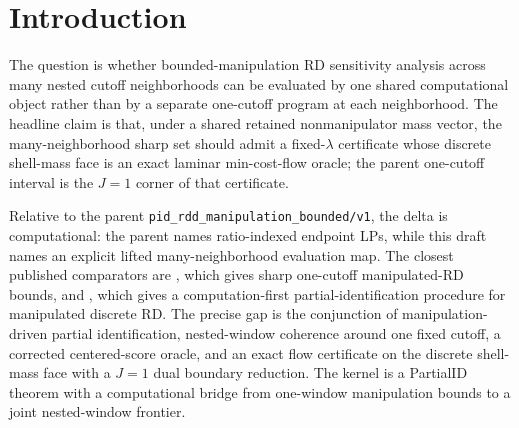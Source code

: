 \documentclass[11pt]{article}
\theoremstyle{definition}
\theoremstyle{plain}
\theoremstyle{remark}
\begin{document}
\begin{abstract}
The banked parent proposal \texttt{pid\_rdd\_manipulation\_bounded/v1} gives a sharp
one-cutoff manipulation envelope for a local RD Wald effect. This draft asks for the
computational upgrade needed when the analyst reports sharp bounds jointly across many
nested cutoff neighborhoods instead of one window at a time. The kernel claim is that the
shared nonmanipulator mass vector across nested windows creates a laminar feasibility system,
and that on an explicit discrete shell-mass face the fixed-\(\lambda\) upper-orthant problem
admits an exact incidence-based min-cost-flow representation with a dual certificate that
specializes to the parent \(J=1\) interval. The open part is the passage from that exact
network oracle to the unrestricted finite-support many-window problem. If correct, the result
turns a qualitative many-window sensitivity idea into a computable evaluation map and makes
intersection-bound inference operational for manipulation-robust RD frontiers.
\end{abstract}

\section{Introduction}
The question is whether bounded-manipulation RD sensitivity analysis across many nested
cutoff neighborhoods can be evaluated by one shared computational object rather than by a
separate one-cutoff program at each neighborhood. The headline claim is that, under a shared
retained nonmanipulator mass vector, the many-neighborhood sharp set should admit a
fixed-\(\lambda\) certificate whose discrete shell-mass face is an exact laminar min-cost-flow
oracle; the parent one-cutoff interval is the \(J=1\) corner of that certificate.

Relative to the parent \texttt{pid\_rdd\_manipulation\_bounded/v1}, the delta is computational:
the parent names ratio-indexed endpoint LPs, while this draft names an explicit lifted
many-neighborhood evaluation map. The closest published comparators are
\citet[Abstract]{gerard_rokkanen_rothe_2020_rdbounds}, which gives sharp one-cutoff
manipulated-RD bounds, and \citet[Abstract]{rosenman_rajkumar_gauriot_slonim_2019_discrete_manipulation},
which gives a computation-first partial-identification procedure for manipulated discrete RD.
The precise gap is the conjunction of manipulation-driven partial identification,
nested-window coherence around one fixed cutoff, a corrected centered-score oracle, and an
exact flow certificate on the discrete shell-mass face with a \(J=1\) dual boundary
reduction. The kernel is a PartialID theorem with a computational bridge from one-window
manipulation bounds to a joint nested-window frontier.
\end{document}
